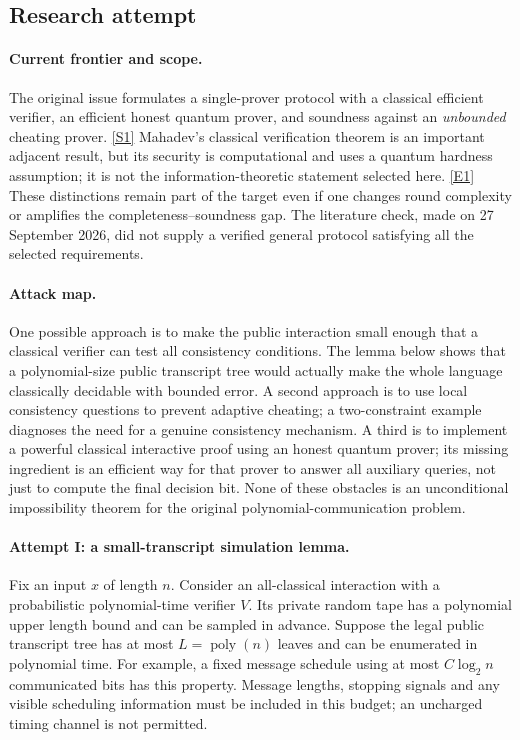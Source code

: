 \documentclass[11pt,a4paper]{article}
\newcommand{\sref}[2]{\hyperlink{source:#1:#2}{[S#2]}}
\newcommand{\eref}[2]{\hyperlink{extra:#1:#2}{[E#2]}}
\numberwithin{equation}{section}
\begin{document}
\subsection{Research attempt}

\paragraph{Current frontier and scope.}
The original issue formulates a single-prover protocol with a classical
efficient verifier, an efficient honest quantum prover, and soundness
against an \emph{unbounded} cheating prover. \sref{30006741}{1}
Mahadev's classical verification theorem is an important adjacent result,
but its security is computational and uses a quantum hardness assumption;
it is not the information-theoretic statement selected here.
\eref{30006741}{1}  These distinctions remain part of the target even if
one changes round complexity or amplifies the completeness--soundness
gap.  The literature check, made on 27 September 2026, did not supply
a verified general protocol satisfying all the selected requirements.

\paragraph{Attack map.}
One possible approach is to make the public interaction small enough
that a classical verifier can test all consistency conditions.  The
lemma below shows that a polynomial-size public transcript tree would
actually make the whole language classically decidable with bounded
error.  A second approach is to use local consistency questions to
prevent adaptive cheating; a two-constraint example diagnoses the
need for a genuine consistency mechanism.  A third is to implement a
powerful classical interactive proof using an honest quantum prover;
its missing ingredient is an efficient way for that prover to answer
all auxiliary queries, not just to compute the final decision bit.
None of these obstacles is an unconditional impossibility theorem for
the original polynomial-communication problem.

\paragraph{Attempt I: a small-transcript simulation lemma.}
Fix an input $x$ of length $n$.  Consider an all-classical interaction
with a probabilistic polynomial-time verifier $V$.  Its private random
tape has a polynomial upper length bound and can be sampled in advance.
Suppose the legal public transcript tree has at most $L=\operatorname{poly}(n)$
leaves and can be enumerated in polynomial time.  For example, a fixed
message schedule using at most $C\log_2 n$ communicated bits has this
property.  Message lengths, stopping signals and any visible scheduling
information must be included in this budget; an uncharged timing
channel is not permitted.
\end{document}

